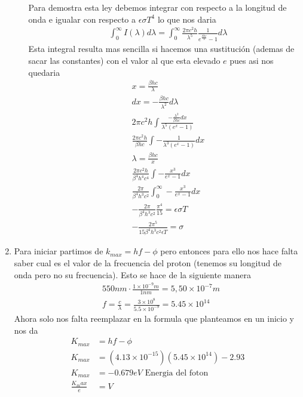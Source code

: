 \documentclass[12pt]{exam}
\begin{document}
\begin{enumerate}
\begin{itemize}
				Para demostra esta ley debemos integrar con respecto a la longitud de onda e igualar con respecto a $\epsilon\sigma T^4$ lo que nos daria
				\begin{align*}
					&\int_0^\infty I(\lambda) d\lambda = \int_0^\infty \frac{2\pi c^2h}{\lambda^5}\frac{1}{e^{\frac{\beta hc}{\lambda}}-1}d\lambda
				\end{align*}
				Esta integral resulta mas sencilla si hacemos una sustitución (ademas de sacar las constantes) con el valor al que esta elevado $e$ pues asi nos quedaria
				\begin{align*}
					&x = \frac{\beta hc}{\lambda}\\
					&dx = -\frac{\beta hc}{\lambda^2}d\lambda\\
					&2\pi c^2h \int \frac{-\frac{\lambda^2}{\beta hc}dx}{\lambda^5(e^x -1)}\\
					&\frac{2 \pi c^2h}{\beta hc}\int -\frac{1}{\lambda^3(e^x-1)}dx\\
					&\lambda = \frac{\beta hc}{x}\\
					&\frac{2 \pi c^2h}{\beta^4 h^4c^4} \int -\frac{x^3}{e^x - 1}dx\\
					&\frac{2\pi}{\beta^4 h^3c^2} \int_0^\infty -\frac{x^3}{e^x - 1}dx\\
					&-\frac{2\pi}{\beta^4 h^3c^2} \frac{\pi^4}{15}=\epsilon \sigma T\\
					&-\frac{2\pi^5}{15\beta^4 h^3c^2\epsilon T}=\sigma
				\end{align*}
		\end{itemize}
	\item Para iniciar partimos de $k_{max} = hf-\phi$ pero entonces para ello nos hace falta saber cual es el valor de la frecuencia del proton (tenemos su longitud de onda pero no su frecuencia). Esto se hace de la siguiente manera
		\begin{align*}
			&550nm \cdot \frac{1\times 10^{-9}m}{1nm} = 5,50\times10^{-7}m\\
			&f=\frac{c}{\lambda} = \frac{3\times10^8}{5.5\times10^{-9}} = 5.45\times10^14
		\end{align*}
		Ahora solo nos falta reemplazar en la formula que planteamos en un inicio y nos da
		\begin{align*}
			K_{max} &= hf - \phi\\
			K_{max} &= (4.13\times10^{-15})(5.45\times10^{14})-2.93\\
			K_{max} &= -0.679 eV \text{ Energia del foton }\\
			\frac{K_max}{e} &= V\\

\end{align*}
\end{enumerate}
\end{document}
